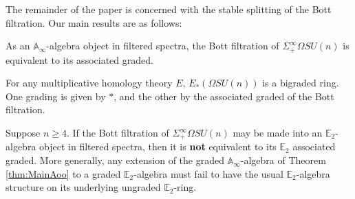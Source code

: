 \begin{comment}
***commented out**
\begin{exm}
Recall once more that, as $n$ tends to $\infty$, the Bott filtration is given by
$$* \longrightarrow BU(1) \longrightarrow BU(2) \longrightarrow BU(3) \longrightarrow \cdots \longrightarrow BU \simeq \Omega SU.$$
The associated graded of the stable Bott filtration is then given by
$$
\bigvee_n \Sigma^{\infty} BU(n+1)/BU(n) \simeq \bigvee_n MU(n),
$$
where $MU(n)$ is the Thom spectrum of the canonical bundle over $BU(n)$.  In this case, the Mitchell-Richter splitting recovers an older splitting due to Snaith \cite{SnaithBook}
$$\Sigma^{\infty}_+ BU \simeq \bigvee_n MU(n).$$
The $\mathbb{E}_2$-algebra structure described in Construction \ref{cnstr:IntroGr} is that arising from the Thom construction applied to 
$$\coprod BU(n) \stackrel{J}{\longrightarrow} Pic(\mathbb{S}).$$
This should be compared with the $\mathbb{E}_2$-ring structure on $\Sigma^{\infty}_+ BU$ that arises from the double loop space structure on $BU$.
\end{exm}
**end**
\end{comment}

The remainder of the paper is concerned with the stable splitting of the Bott filtration.  Our main results are as follows:

\begin{thm} \label{thm:MainAoo}
As an $\mathbb{A}_\infty$-algebra object in filtered spectra, the Bott filtration of $\Sigma^{\infty}_+ \Omega SU(n)$ is equivalent to its associated graded.
\end{thm}

\begin{cor}
For any multiplicative homology theory $E$, $E_*(\Omega SU(n))$ is a bigraded ring.  One grading is given by $*$, and the other by the associated graded of the Bott filtration.
\end{cor}

\begin{thm} \label{thm:MainObstruction}
Suppose $n \ge 4$.  If the Bott filtration of $\Sigma^{\infty}_+ \Omega SU(n)$ may be made into an $\mathbb{E}_2$-algebra object in filtered spectra, then it is \textbf{not} equivalent to its $\mathbb{E}_2$ associated graded.  More generally, any extension of the graded $\mathbb{A}_\infty$-algebra of Theorem \ref{thm:MainAoo} to a graded $\mathbb{E}_2$-algebra must fail to have the usual $\mathbb{E}_2$-algebra structure on its underlying ungraded $\mathbb{E}_2$-ring.
\end{thm}


